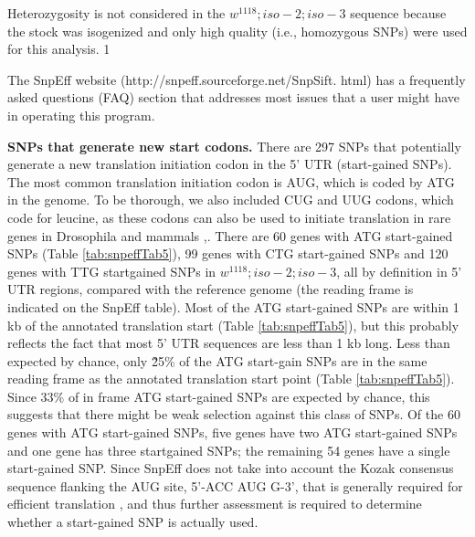 Heterozygosity is not considered in the $w^{1118} ; iso-2; iso-3$ sequence because the stock was isogenized and only high quality (i.e., homozygous SNPs) were used for this analysis. 1 

The SnpEff website (http://snpeff.sourceforge.net/SnpSift.  html) has a frequently asked questions (FAQ) section that addresses most issues that a user might have in operating this program.

\textbf{SNPs that generate new start codons.} There are 297 SNPs that potentially generate a new translation initiation codon in the 5' UTR (start-gained SNPs). The most common translation initiation codon is AUG, which is coded by ATG in the genome.  To be thorough, we also included CUG and UUG codons, which code for leucine, as these codons can also be used to initiate translation in rare genes in Drosophila and mammals \cite{sugihara1990drosophila},\cite{ivanov2011identification}. There are 60 genes with ATG start-gained SNPs (Table \ref{tab:snpeffTab5}), 99 genes with CTG start-gained SNPs and 120 genes with TTG startgained SNPs in $w^{1118} ; iso-2; iso-3$, all by definition in 5' UTR regions, compared with the reference genome (the reading frame is indicated on the SnpEff table). Most of the ATG start-gained SNPs are within 1 kb of the annotated translation start (Table \ref{tab:snpeffTab5}), but this probably reflects the fact that most 5' UTR sequences are less than 1 kb long. Less than expected by chance, only \~25\% of the ATG start-gain SNPs are in the same reading frame as the annotated translation start point (Table \ref{tab:snpeffTab5}). Since 33\% of in frame ATG start-gained SNPs are expected by chance, this suggests that there might be weak selection against this class of SNPs. Of the 60 genes with ATG start-gained SNPs, five genes have two ATG start-gained SNPs and one gene has three startgained SNPs; the remaining 54 genes have a single start-gained SNP. Since SnpEff does not take into account the Kozak consensus sequence flanking the AUG site, 5'-ACC AUG G-3', that is generally required for efficient translation \cite{kozak1987analysis}, and thus further assessment is required to determine whether a start-gained SNP is actually used.



